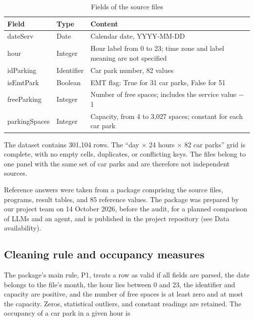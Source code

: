 \documentclass[default]{subfiles}
\begin{document}
{\begin{table}[htbp]
  \caption{Fields of the source files}
  \label{tab:1}
  \centering\small
  \begin{tabular}{p{}p{}p{}}
    \hline
    \textbf{Field} & \textbf{Type} & \textbf{Content} \\ \hline
    dateServ & Date & Calendar date, YYYY-MM-DD \\
    hour & Integer & Hour label from 0 to 23; time zone and label meaning are not specified \\
    idParking & Identifier & Car park number, 82 values \\
    isEmtPark & Boolean & EMT flag: True for 31 car parks, False for 51 \\
    freeParking & Integer & Number of free spaces; includes the service value $-$1 \\
    parkingSpaces & Integer & Capacity, from 4 to 3,027 spaces; constant for each car park \\
    \hline
  \end{tabular}
\end{table}

The dataset contains 301,104 rows. The ``day $\times$ 24 hours $\times$ 82 car parks'' grid is complete, with no empty cells, duplicates, or conflicting keys. The files belong to one panel with the same set of car parks and are therefore not independent sources.

Reference answers were taken from a package comprising the source files, programs, result tables, and 85 reference values. The package was prepared by our project team on 14 October 2026, before the audit, for a planned comparison of LLMs and an agent, and is published in the project repository (see Data availability).

\subsection{Cleaning rule and occupancy measures}

The package's main rule, P1, treats a row as valid if all fields are parsed, the date belongs to the file's month, the hour lies between 0 and 23, the identifier and capacity are positive, and the number of free spaces is at least zero and at most the capacity. Zeros, statistical outliers, and constant readings are retained. The occupancy of a car park in a given hour is

}
\end{document}
